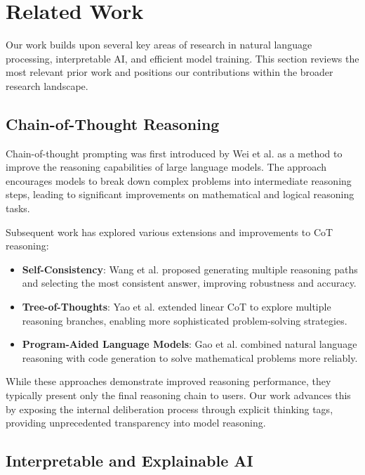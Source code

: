 \section{Related Work}
\label{sec:related_work}

Our work builds upon several key areas of research in natural language processing, interpretable AI, and efficient model training. This section reviews the most relevant prior work and positions our contributions within the broader research landscape.

\subsection{Chain-of-Thought Reasoning}

Chain-of-thought prompting was first introduced by Wei et al. \cite{wei2022chain} as a method to improve the reasoning capabilities of large language models. The approach encourages models to break down complex problems into intermediate reasoning steps, leading to significant improvements on mathematical and logical reasoning tasks.

Subsequent work has explored various extensions and improvements to CoT reasoning:
\begin{itemize}
    \item \textbf{Self-Consistency}: Wang et al. \cite{wang2022self} proposed generating multiple reasoning paths and selecting the most consistent answer, improving robustness and accuracy.
    \item \textbf{Tree-of-Thoughts}: Yao et al. \cite{yao2023tree} extended linear CoT to explore multiple reasoning branches, enabling more sophisticated problem-solving strategies.
    \item \textbf{Program-Aided Language Models}: Gao et al. \cite{gao2023pal} combined natural language reasoning with code generation to solve mathematical problems more reliably.
\end{itemize}

While these approaches demonstrate improved reasoning performance, they typically present only the final reasoning chain to users. Our work advances this by exposing the internal deliberation process through explicit thinking tags, providing unprecedented transparency into model reasoning.

\subsection{Interpretable and Explainable AI}

